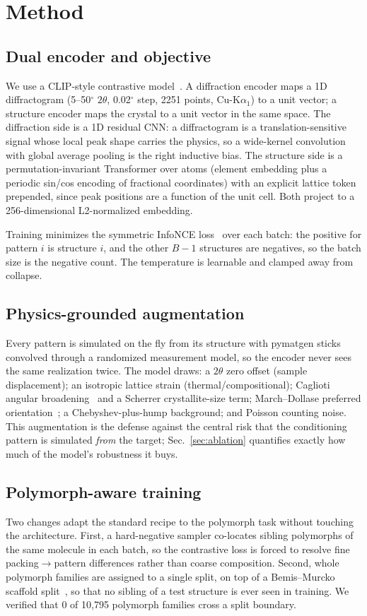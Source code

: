 \documentclass[conference]{IEEEtran}
\begin{document}
\section{Method}
\subsection{Dual encoder and objective}
We use a CLIP-style contrastive model~\cite{radford2021clip}. A diffraction
encoder maps a 1D diffractogram (5--50$^\circ$ $2\theta$, 0.02$^\circ$ step,
2251 points, Cu-K$\alpha_1$) to a unit vector; a structure encoder maps the
crystal to a unit vector in the same space. The diffraction side is a 1D residual
CNN: a diffractogram is a translation-sensitive signal whose local peak shape
carries the physics, so a wide-kernel convolution with global average pooling is
the right inductive bias. The structure side is a permutation-invariant
Transformer over atoms (element embedding plus a periodic sin/cos encoding of
fractional coordinates) with an explicit lattice token prepended, since peak
positions are a function of the unit cell. Both project to a 256-dimensional
L2-normalized embedding.

Training minimizes the symmetric InfoNCE loss~\cite{oord2018cpc,radford2021clip}
over each batch: the positive for pattern $i$ is structure $i$, and the other
$B{-}1$ structures are negatives, so the batch size is the negative count. The
temperature is learnable and clamped away from collapse.

\subsection{Physics-grounded augmentation}
Every pattern is simulated on the fly from its structure with pymatgen sticks
convolved through a randomized measurement model, so the encoder never sees the
same realization twice. The model draws: a $2\theta$ zero offset (sample
displacement); an isotropic lattice strain (thermal/compositional); Caglioti
angular broadening~\cite{caglioti1958} and a Scherrer crystallite-size term;
March--Dollase preferred orientation~\cite{dollase1986}; a Chebyshev-plus-hump
background; and Poisson counting noise. This augmentation is the defense against
the central risk that the conditioning pattern is simulated \emph{from} the
target; Sec.~\ref{sec:ablation} quantifies exactly how much of the model's
robustness it buys.

\subsection{Polymorph-aware training}
Two changes adapt the standard recipe to the polymorph task without touching the
architecture. First, a hard-negative sampler co-locates sibling polymorphs of the
same molecule in each batch, so the contrastive loss is forced to resolve fine
packing$\rightarrow$pattern differences rather than coarse composition. Second,
whole polymorph families are assigned to a single split, on top of a
Bemis--Murcko scaffold split~\cite{bemis1996murcko}, so that no sibling of a test
structure is ever seen in training. We verified that 0 of 10{,}795 polymorph
families cross a split boundary.
\end{document}

